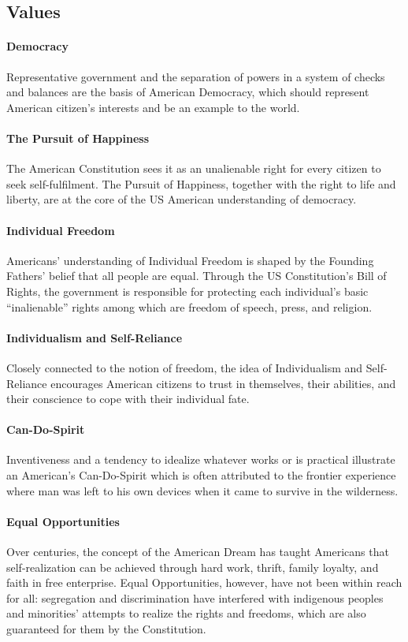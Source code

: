 \documentclass[10pt]{article}
\begin{document}
\subsection{Values}
	\label{ssec:usa@values}
\paragraph{Democracy}
Representative government and the separation of powers in a system of checks
and balances are the basis of American Democracy, which should represent American
citizen's interests and be an example to the world.

\paragraph{The Pursuit of Happiness}
The American Constitution sees it as an unalienable right for every citizen to seek
self-fulfilment. The Pursuit of Happiness, together with the right to life and liberty, are at the core of the
US American understanding of democracy.

\paragraph{Individual Freedom}
Americans' understanding of Individual Freedom is shaped by the Founding Fathers' belief that all
people are equal. Through the US Constitution's Bill of Rights, the government is
responsible for protecting each individual's basic \enquote{inalienable} rights among
which are freedom of speech, press, and religion.

\paragraph{Individualism and Self-Reliance}
Closely connected to the notion of freedom, the idea of Individualism and Self-Reliance encourages American
citizens to trust in themselves, their abilities, and their conscience to cope with
their individual fate.

\paragraph{Can-Do-Spirit}
Inventiveness and a tendency to idealize whatever works or is practical illustrate
an American's Can-Do-Spirit which is often attributed to the frontier experience where man
was left to his own devices when it came to survive in the wilderness.

\paragraph{Equal Opportunities}
Over centuries, the concept of the American Dream has taught Americans that
self-realization can be achieved through hard work, thrift, family loyalty, and faith
in free enterprise. Equal Opportunities, however, have not been within reach for all: segregation and
discrimination have interfered with indigenous peoples and minorities' attempts
to realize the rights and freedoms, which are also guaranteed for them by the
Constitution.
\end{document}
